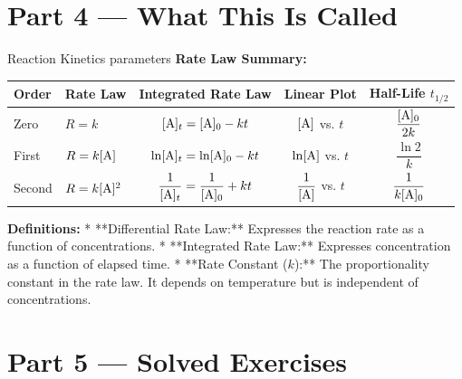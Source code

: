 \documentclass[12pt, a4paper]{book}
\begin{document}
\section{Part 4 --- What This Is Called}

\begin{namedconcept}{Reaction Kinetics parameters}
\textbf{Rate Law Summary:}

\begin{center}
\begin{tabular}{llccc}
\toprule
\textbf{Order} & \textbf{Rate Law} & \textbf{Integrated Rate Law} & \textbf{Linear Plot} & \textbf{Half-Life } $t_{1/2}$ \\
\midrule
Zero & $R = k$ & $[\ce{A}]_t = [\ce{A}]_0 - kt$ & $[\ce{A}]$ vs. $t$ & $\dfrac{[\ce{A}]_0}{2k}$ \\[8pt]
First & $R = k[\ce{A}]$ & $\ln[\ce{A}]_t = \ln[\ce{A}]_0 - kt$ & $\ln[\ce{A}]$ vs. $t$ & $\dfrac{\ln 2}{k}$ \\[8pt]
Second & $R = k[\ce{A}]^2$ & $\dfrac{1}{[\ce{A}]_t} = \dfrac{1}{[\ce{A}]_0} + kt$ & $\dfrac{1}{[\ce{A}]}$ vs. $t$ & $\dfrac{1}{k[\ce{A}]_0}$ \\
\bottomrule
\end{tabular}
\end{center}

\medskip
\textbf{Definitions:}
* **Differential Rate Law:** Expresses the reaction rate as a function of concentrations.
* **Integrated Rate Law:** Expresses concentration as a function of elapsed time.
* **Rate Constant ($k$):** The proportionality constant in the rate law. It depends on temperature but is independent of concentrations.
\end{namedconcept}

\newpage

\section{Part 5 --- Solved Exercises}
\end{document}
